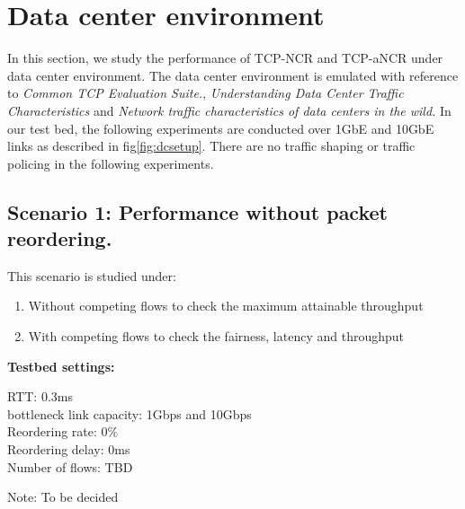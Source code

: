 \section{Data center environment\label{sec:DCScenario}}
In this section, we study the performance of TCP-NCR and TCP-aNCR under data center environment. The data center environment is emulated with reference to \textit{Common TCP Evaluation Suite.}\cite{tcpevalsuite}, \textit{Understanding Data Center Traffic Characteristics}\cite{Benson:2010:UDC:1672308.1672325} and \textit{Network traffic characteristics of data centers in the wild.}\cite{Benson:2010:NTC:1879141.1879175} In our test bed, the following experiments are conducted over 1GbE and 10GbE links as described in fig\ref{fig:dcsetup}.
There are no traffic shaping or traffic policing in the following experiments.
\\
\subsection{Scenario 1: Performance without packet reordering.\label{ss:dc1}}
This scenario is studied under:
\begin{enumerate}
    \item Without competing flows to check the maximum attainable throughput
    \item With competing flows to check the fairness, latency and throughput
\end{enumerate}

\textbf{Testbed settings:}
\begin{tabbing}
\quad RTT: 0.3ms \\
\quad bottleneck link capacity: 1Gbps and 10Gbps \\
\quad Reordering rate: 0\% \\
\quad Reordering delay: 0ms \\
\quad Number of flows: TBD \\
\end{tabbing}
Note: To be decided\\

